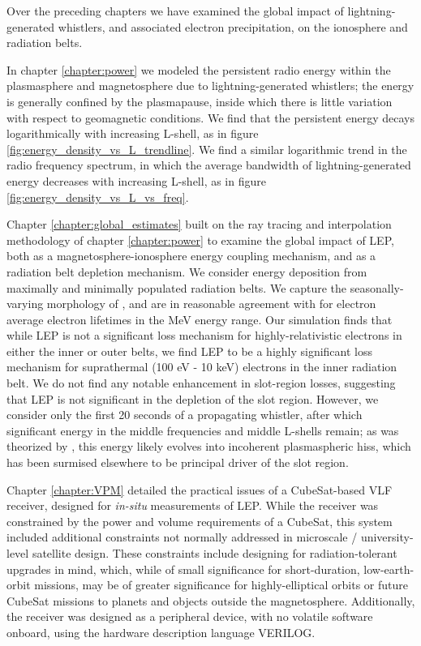 Over the preceding chapters we have examined the global impact of lightning-generated whistlers, and associated electron precipitation, on the ionosphere and radiation belts. 

In chapter \ref{chapter:power} we modeled the persistent radio energy within the plasmasphere and magnetosphere due to lightning-generated whistlers; the energy is generally confined by the plasmapause, inside which there is little variation with respect to geomagnetic conditions. We find that the persistent energy decays logarithmically with increasing L-shell, as in figure \ref{fig:energy_density_vs_L_trendline}. We find a similar logarithmic trend in the radio frequency spectrum, in which the average bandwidth of lightning-generated energy decreases with increasing L-shell, as in figure \ref{fig:energy_density_vs_L_vs_freq}.

Chapter \ref{chapter:global_estimates} built on the ray tracing and interpolation methodology of chapter \ref{chapter:power} to examine the global impact of LEP, both as a magnetosphere-ionosphere energy coupling mechanism, and as a radiation belt depletion mechanism. We consider energy deposition from maximally and minimally populated radiation belts. We capture the seasonally-varying morphology of \cite{Gemelos2009}, and are in reasonable agreement with \cite{Meredith2007} for electron average electron lifetimes in the MeV energy range. Our simulation finds that while LEP is not a significant loss mechanism for highly-relativistic electrons in either the inner or outer belts, we find LEP to be a highly significant loss mechanism for suprathermal (100 eV - 10 keV) electrons in the inner radiation belt. We do not find any notable enhancement in slot-region losses, suggesting that LEP is not significant in the depletion of the slot region. However, we consider only the first 20 seconds of a propagating whistler, after which significant energy in the middle frequencies and middle L-shells remain; as was theorized by \cite{Bortnik2005}, this energy likely evolves into incoherent plasmaspheric hiss, which has been surmised elsewhere to be principal driver of the slot region.

Chapter \ref{chapter:VPM} detailed the practical issues of a CubeSat-based VLF receiver, designed for \emph{in-situ} measurements of LEP. While the receiver was constrained by the power and volume requirements of a CubeSat, this system included additional constraints not normally addressed in microscale / university-level satellite design. These constraints include designing for radiation-tolerant upgrades in mind, which, while of small significance for short-duration, low-earth-orbit missions, may be of greater significance for highly-elliptical orbits or future CubeSat missions to planets and objects outside the magnetosphere. Additionally, the receiver was designed as a peripheral device, with no volatile software onboard, using the hardware description language VERILOG.

